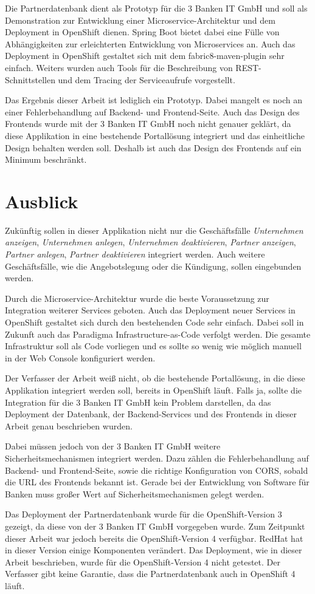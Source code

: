 Die Partnerdatenbank dient als Prototyp für die 3 Banken IT GmbH und soll als Demonstration zur Entwicklung einer Microservice-Architektur und dem Deployment in OpenShift dienen. Spring Boot bietet dabei eine Fülle von Abhängigkeiten zur erleichterten Entwicklung von Microservices an. Auch das Deployment in OpenShift gestaltet sich mit dem fabric8-maven-plugin sehr einfach. Weiters wurden auch Tools für die Beschreibung von REST-Schnittstellen und dem Tracing der Serviceaufrufe vorgestellt.

Das Ergebnis dieser Arbeit ist lediglich ein Prototyp. Dabei mangelt es noch an einer Fehlerbehandlung auf Backend- und Frontend-Seite. Auch das Design des Frontends wurde mit der 3 Banken IT GmbH noch nicht genauer geklärt, da diese Applikation in eine bestehende Portallösung integriert und das einheitliche Design behalten werden soll. Deshalb ist auch das Design des Frontends auf ein Minimum beschränkt. 

\section{Ausblick}
Zukünftig sollen in dieser Applikation nicht nur die Geschäftsfälle \textit{Unternehmen anzeigen}, \textit{Unternehmen anlegen}, \textit{Unternehmen deaktivieren}, \textit{Partner anzeigen}, \textit{Partner anlegen}, \textit{Partner deaktivieren} integriert werden. Auch weitere Geschäftsfälle, wie die Angebotslegung oder die Kündigung, sollen eingebunden werden.

Durch die Microservice-Architektur wurde die beste Voraussetzung zur Integration weiterer Services geboten. Auch das Deployment neuer Services in OpenShift gestaltet sich durch den bestehenden Code sehr einfach. Dabei soll in Zukunft auch das Paradigma Infrastructure-as-Code verfolgt werden. Die gesamte Infrastruktur soll als Code vorliegen und es sollte so wenig wie möglich manuell in der Web Console konfiguriert werden.

Der Verfasser der Arbeit weiß nicht, ob die bestehende Portallösung, in die diese Applikation integriert werden soll, bereits in OpenShift läuft. Falls ja, sollte die Integration für die 3 Banken IT GmbH kein Problem darstellen, da das Deployment der Datenbank, der Backend-Services und des Frontends in dieser Arbeit genau beschrieben wurden.

Dabei müssen jedoch von der 3 Banken IT GmbH weitere Sicherheitsmechanismen integriert werden. Dazu zählen die Fehlerbehandlung auf Backend- und Frontend-Seite, sowie die richtige Konfiguration von CORS, sobald die URL des Frontends bekannt ist.
Gerade bei der Entwicklung von Software für Banken muss großer Wert auf Sicherheitsmechanismen gelegt werden.

Das Deployment der Partnerdatenbank wurde für die OpenShift-Version 3 gezeigt, da diese von der 3 Banken IT GmbH vorgegeben wurde. Zum Zeitpunkt dieser Arbeit war jedoch bereits die OpenShift-Version 4 verfügbar. RedHat hat in dieser Version einige Komponenten verändert. Das Deployment, wie in dieser Arbeit beschrieben, wurde für die OpenShift-Version 4 nicht getestet. Der Verfasser gibt keine Garantie, dass die Partnerdatenbank auch in OpenShift 4 läuft.